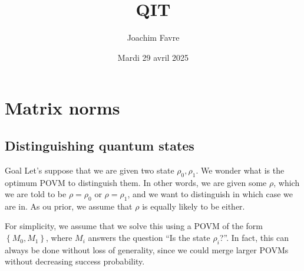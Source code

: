 \documentclass[a4paper]{article}
\title{QIT}
\author{Joachim Favre}
\date{Mardi 29 avril 2025}
\begin{document}
\maketitle


\section{Matrix norms}
\subsection{Distinguishing quantum states}

\begin{parag}{Goal}
    Let's suppose that we are given two state $\rho_0, \rho_1$. We wonder what is the optimum POVM to distinguish them. In other words, we are given some $\rho$, which we are told to be $\rho = \rho_0$ or $\rho = \rho_1$, and we want to distinguish in which case we are in. As ou prior, we assume that $\rho$ is equally likely to be either. 

    For simplicity, we assume that we solve this using a POVM of the form $\left\{M_0, M_1\right\}$, where $M_i$ answers the question ``Is the state $\rho_i$?''. In fact, this can always be done without loss of generality, since we could merge larger POVMs without decreasing success probability.
\end{parag}
\end{document}
